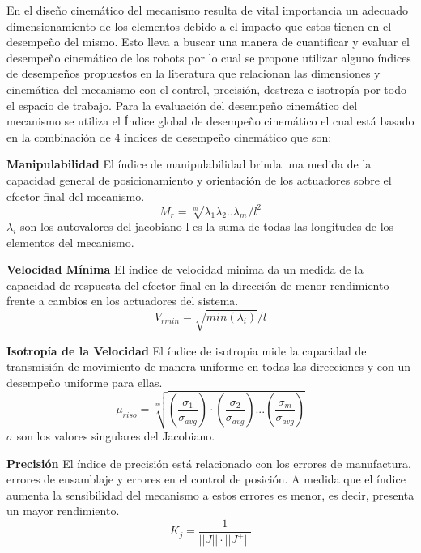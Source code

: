 En el diseño cinemático del mecanismo resulta de vital importancia un adecuado dimensionamiento de los elementos debido a el impacto que estos tienen en el desempeño del mismo. Esto lleva a buscar una manera de cuantificar y evaluar el desempeño cinemático de los robots por lo cual se propone utilizar alguno índices de desempeños propuestos en la literatura que relacionan las dimensiones y cinemática del mecanismo con el control, precisión, destreza e isotropía por todo el espacio de trabajo. 
Para la evaluación del desempeño cinemático del mecanismo se utiliza el Índice global de desempeño cinemático \citep{zhang2014GlobalI} el cual está basado en la combinación de 4 índices de desempeño cinemático que son:

\textbf{Manipulabilidad}\newline
El índice de manipulabilidad brinda una medida de la capacidad general de posicionamiento y orientación de los actuadores sobre el efector final del mecanismo.
\begin{equation}
    M_{r}= \sqrt[m]{\lambda_1\lambda_2 ..\lambda_m}/l^2 
\end{equation}
$\lambda_i$ son los autovalores del jacobiano\newline
l es la suma de todas las longitudes de los elementos del mecanismo.\newline


\textbf{Velocidad Mínima}\newline
El índice de velocidad minima da un medida de la capacidad de respuesta del efector final en la dirección de menor rendimiento frente a cambios en los actuadores del sistema.
\begin{equation}
    V_{rmin}= \sqrt{min(\lambda_i)}/l
\end{equation}

\textbf{Isotropía de la Velocidad}\newline
El índice de isotropia mide la capacidad de transmisión de movimiento de manera uniforme en todas las direcciones y con un desempeño uniforme para ellas.
\begin{equation}
    \mu_{riso}= \sqrt[m]{\left(\frac{\sigma_1}{\sigma_{avg}}\right)\cdot\left(\frac{\sigma_2}{\sigma_{avg}}\right)...\left(\frac{\sigma_m}{\sigma_{avg}}\right)}
\end{equation}
$\sigma$ son los valores singulares del Jacobiano.\newline


\textbf{Precisión}\newline{}
El índice de precisión está relacionado con los errores de manufactura, errores de ensamblaje y errores en el control de posición. A medida que el índice aumenta la sensibilidad del mecanismo a estos errores es menor, es decir, presenta un mayor rendimiento.
\begin{equation}
    K_j = \frac{1}{||J||\cdot||J^+||}
\end{equation}

